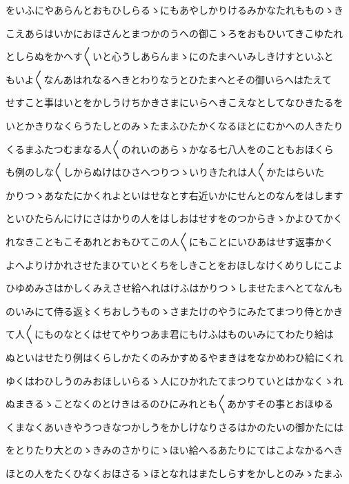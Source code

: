 \documentclass[a4paper,11pt,landscape]{ltjtarticle}
\begin{document}
\par\medskip
をいふにやあらんとおもひしらるゝにもあやしかりけるみかなたれもものゝき
\par\medskip
こえあらはいかにおほさんとまつかのうへの御こゝろをおもひいてきこゆたれ
\par\medskip
としらぬをかへす〱いと心うしあらんまゝにのたまへいみしきけすといふと
\par\medskip
もいよ〱なんあはれなるへきとわりなうとひたまへとその御いらへはたえて
\par\medskip
せすこと事はいとをかしうけちかきさまにいらへきこえなとしてなひきたるを
\par\medskip
いとかきりなくらうたしとのみゝたまふひたかくなるほとにむかへの人きたり
\par\medskip
くるまふたつむまなる人〱のれいのあらゝかなる七八人をのこともおほくら
\par\medskip
も例のしな〱しからぬけはひさへつりつゝいりきたれは人〱かたはらいた
\par\medskip
かりつゝあなたにかくれよといはせなとす右近いかにせんとのなんをはします
\par\medskip
といひたらんにけにさはかりの人をはしおはせすをのつからきゝかよひてかく
\par\medskip
れなきこともこそあれとおもひてこの人〱にもことにいひあはせす返事かく
\par\medskip
よへよりけかれさせたまひていとくちをしきことをおほしなけくめりしにこよ
\par\medskip
ひゆめみさはかしくみえさせ給へれはけふはかりつゝしませたまへとてなんも
\par\medskip
のいみにて侍る返〻くちおしうものゝさまたけのやうにみたてまつり侍とかき
\par\medskip
て人〱にものなとくはせてやりつあま君にもけふはものいみにてわたり給は
\par\medskip
ぬといはせたり例はくらしかたくのみかすめるやまきはをなかめわひ給にくれ
\par\medskip
ゆくはわひしうのみおほしいらるゝ人にひかれたてまつりていとはかなくゝれ
\par\medskip
ぬまきるゝことなくのとけきはるのひにみれとも〱あかすその事とおほゆる
\par\medskip
くまなくあいきやうつきなつかしうをかしけなりさるはかのたいの御かたには
\par\medskip
をとりたり大とのゝきみのさかりにゝほい給へるあたりにてはこよなかるへき
\par\medskip
ほとの人をたくひなくおほさるゝほとなれはまたしらすをかしとのみゝたまふ
\par\medskip
\end{document}
